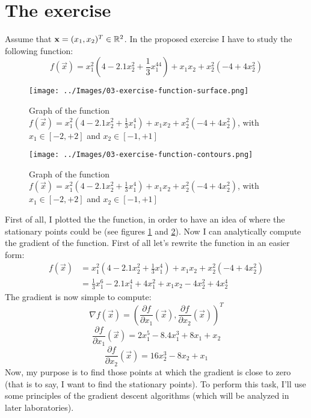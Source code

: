 \section{The exercise}
    Assume that \(\mathbf{x} = (x_1, x_2)^T \in \mathbb{R}^2\). In the proposed exercise I have to study the following function:
    \[f(\vec{x}) = x_1^2(4 - 2.1x_2^2 + \frac{1}{3}x_1^44) + x_1x_2 + x_2^2(-4 + 4x_2^2)\]
    \begin{figure}
        \centering
        \texttt{[image: ../Images/03-exercise-function-surface.png]}
        \caption{Graph of the function \(f(\vec{x}) = x_1^2(4 - 2.1x_2^2 + \frac{1}{3}x_1^4) + x_1x_2 + x_2^2(-4 + 4x_2^2)\), with \(x_1 \in [-2, +2]\) and \(x_2 \in [-1, +1]\)}
        \label{exercise-function-surface}
    \end{figure}
    \begin{figure}
        \centering
        \texttt{[image: ../Images/03-exercise-function-contours.png]}
        \caption{Graph of the function \(f(\vec{x}) = x_1^2(4 - 2.1x_2^2 + \frac{1}{3}x_1^4) + x_1x_2 + x_2^2(-4 + 4x_2^2)\), with \(x_1 \in [-2, +2]\) and \(x_2 \in [-1, +1]\)}
        \label{exercise-function-contours}
    \end{figure}
    First of all, I plotted the the function, in order to have an idea of where the stationary points could be (see figures \ref{exercise-function-surface} and \ref{exercise-function-contours}). Now I can analytically compute the gradient of the function. First of all let's rewrite the function in an easier form:
    \begin{align*}
        f(\vec{x}) &= x_1^2(4 - 2.1x_2^2 + \frac{1}{3}x_1^4) + x_1x_2 + x_2^2(-4 + 4x_2^2) \\
        &= \frac{1}{3}x_1^6 - 2.1x_1^4 + 4x_1^2 + x_1x_2 - 4x_2^2 + 4x_2^4
    \end{align*}
    The gradient is now simple to compute:
        \[\nabla f(\vec{x}) = \left (\frac{\partial f}{\partial x_1}(\vec{x}), \frac{\partial f}{\partial x_2}(\vec{x}) \right )^T\]
        \[\frac{\partial f}{\partial x_1}(\vec{x}) = 2x_1^5 - 8.4x_1^3 + 8x_1 + x_2\]
        \[\frac{\partial f}{\partial x_2}(\vec{x}) = 16x_2^3 - 8x_2 + x_1\]
    Now, my purpose is to find those points at which the gradient is close to zero (that is to say, I want to find the stationary points). To perform this task, I'll use some principles of the gradient descent algorithms (which will be analyzed in later laboratories).
